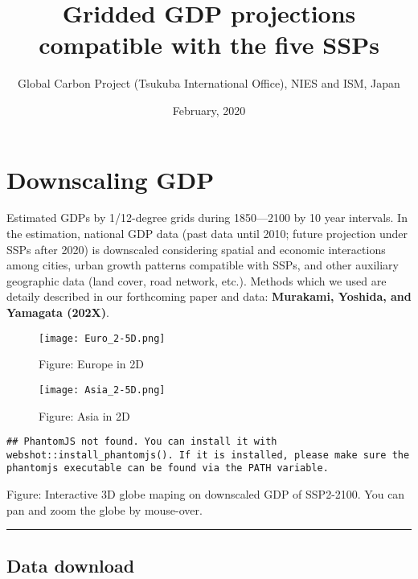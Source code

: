 \documentclass[]{book}
\title{Gridded GDP projections compatible with the five SSPs}
\author{Global Carbon Project (Tsukuba International Office), NIES and ISM, Japan}
\date{February, 2020}
\begin{document}
\maketitle

{
\setcounter{tocdepth}{1}
\tableofcontents
}
\hypertarget{downscaling-gdp}{%
\chapter*{Downscaling GDP}\label{downscaling-gdp}}

Estimated GDPs by 1/12-degree grids during 1850---2100 by 10 year intervals. In the estimation, national GDP data (past data until 2010; future projection under SSPs after 2020) is downscaled considering spatial and economic interactions among cities, urban growth patterns compatible with SSPs, and other auxiliary geographic data (land cover, road network, etc.). Methods which we used are detaily described in our forthcoming paper and data: \textbf{Murakami, Yoshida, and Yamagata (202X)}.

\begin{figure}
\centering
\texttt{[image: Euro\_2-5D.png]}
\caption{Figure: Europe in 2D}
\end{figure}

\begin{figure}
\centering
\texttt{[image: Asia\_2-5D.png]}
\caption{Figure: Asia in 2D}
\end{figure}

\begin{verbatim}
## PhantomJS not found. You can install it with webshot::install_phantomjs(). If it is installed, please make sure the phantomjs executable can be found via the PATH variable.
\end{verbatim}

\hypertarget{5P45eE8BGF}{}

Figure: Interactive 3D globe maping on downscaled GDP of SSP2-2100. You can pan and zoom the globe by mouse-over.

\begin{center}\rule{0.5\linewidth}{\linethickness}\end{center}

\hypertarget{data-download}{%
\section*{Data download}\label{data-download}}
\end{document}
